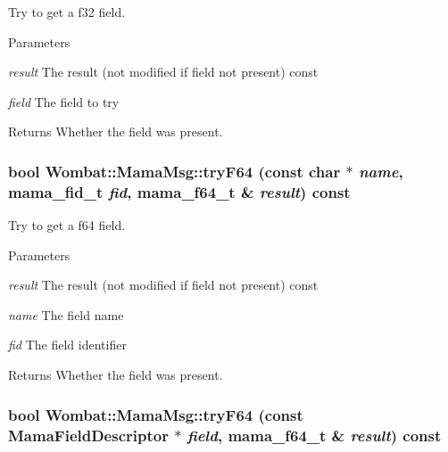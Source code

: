 Try to get a f32 field. 
\begin{DoxyParams}{Parameters}
\item[{\em result}]The result (not modified if field not present) const \item[{\em field}]The field to try \end{DoxyParams}
\begin{DoxyReturn}{Returns}
Whether the field was present. 
\end{DoxyReturn}
\hypertarget{classWombat_1_1MamaMsg_a024ab789f073d6e097d52cfc308d08c7}{
\subsubsection[{tryF64}]{\setlength{\rightskip}{0pt plus 5cm}bool Wombat::MamaMsg::tryF64 (const char $\ast$ {\em name}, \/  mama\_\-fid\_\-t {\em fid}, \/  mama\_\-f64\_\-t \& {\em result}) const}}
\label{classWombat_1_1MamaMsg_a024ab789f073d6e097d52cfc308d08c7}


Try to get a f64 field. 
\begin{DoxyParams}{Parameters}
\item[{\em result}]The result (not modified if field not present) const \item[{\em name}]The field name \item[{\em fid}]The field identifier \end{DoxyParams}
\begin{DoxyReturn}{Returns}
Whether the field was present. 
\end{DoxyReturn}
\hypertarget{classWombat_1_1MamaMsg_a991a82daccf2c15042afcdb81269c5b0}{
\subsubsection[{tryF64}]{\setlength{\rightskip}{0pt plus 5cm}bool Wombat::MamaMsg::tryF64 (const {\bf MamaFieldDescriptor} $\ast$ {\em field}, \/  mama\_\-f64\_\-t \& {\em result}) const}}
\label{classWombat_1_1MamaMsg_a991a82daccf2c15042afcdb81269c5b0}


